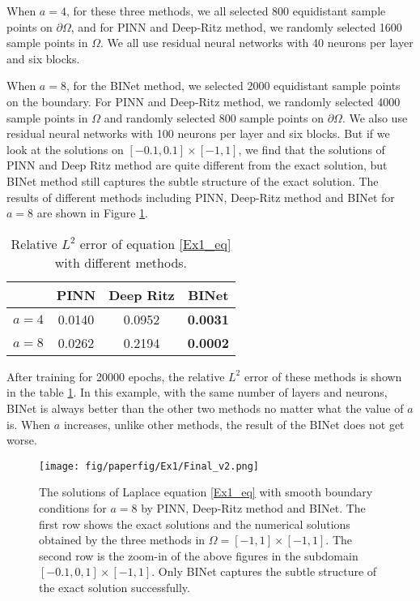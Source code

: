 \documentclass[hyperref]{article}
\numberwithin{equation}{section}
\theoremstyle{nonumberplain}
\begin{document}
	When $a=4$, for these three methods, we all selected 800 equidistant sample points on $\partial\Omega$, and for PINN and Deep-Ritz method, we randomly selected 1600 sample points in $\Omega$. We all use residual neural networks with 40 neurons per layer and six blocks.
	
	When $a=8$, for the BINet method, we selected 2000 equidistant sample points on the boundary. For PINN and Deep-Ritz method, we randomly selected 4000 sample points in $\Omega$ and randomly selected 800 sample points on $\partial\Omega$. We also use residual neural networks with 100 neurons per layer and six blocks. But if we look at the solutions on $[-0.1,0.1]\times[-1,1]$, we find that the solutions of PINN and Deep Ritz method are quite different from the exact solution, but BINet method still captures the subtle structure of the exact solution. The results of different methods including PINN, Deep-Ritz method and BINet for $a=8$ are shown in Figure \ref{Ex1}.
	
	\begin{table}[H]
		\caption{Relative $L^2$ error of equation \eqref{Ex1_eq} with different methods.}
		\label{ex1_table}
		\centering
		\begin{tabular}{cccc}
			\toprule
			& PINN     & Deep Ritz     & {BINet} \\
			\midrule
			$a=4$ & 0.0140 & 0.0952  & \textbf{0.0031}     \\
			$a=8$ & 0.0262 & 0.2194 & \textbf{0.0002}      \\
			
			\bottomrule
		\end{tabular}
	\end{table}
	
	
	After training for 20000 epochs, the relative $L^2$ error of these methods is shown in the table \ref{ex1_table}.  
	In this example, with the same number of layers and neurons, BINet is always better than the other two methods no matter what the value of $a$ is. When $a$ increases, unlike other methods, the result of the BINet does not get worse.
	\noindent
	\begin{figure}[t]
		\centering
		\texttt{[image: fig/paperfig/Ex1/Final\_v2.png]}
		\caption{The solutions of Laplace equation \eqref{Ex1_eq} with smooth boundary conditions for $a=8$ by PINN, Deep-Ritz method and BINet. The first row shows the exact solutions and the numerical solutions obtained by the three methods in $\Omega=[-1,1]\times[-1,1]$. The second row is the zoom-in of the above figures in the subdomain $[-0.1,0,1]\times[-1,1]$. Only BINet captures the subtle structure of the exact solution successfully.}
		\label{Ex1}
	\end{figure}
	
\end{document}

